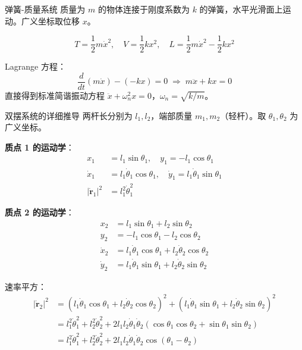 \begin{example}{弹簧-质量系统}
	质量为 $m$ 的物体连接于刚度系数为 $k$ 的弹簧，水平光滑面上运动。广义坐标取位移 $x$。
	
	\[
	T = \frac{1}{2} m \dot{x}^2, \quad V = \frac{1}{2} k x^2, \quad L = \frac{1}{2} m \dot{x}^2 - \frac{1}{2} k x^2
	\]
	
	Lagrange 方程：
	\[
	\frac{d}{dt} \left( m \dot{x} \right) - (-k x) = 0 \;\Longrightarrow\; m \ddot{x} + k x = 0
	\]
	直接得到标准简谐振动方程 $\ddot{x} + \omega_n^2 x = 0$，$\omega_n = \sqrt{k/m}$。
\end{example}

\begin{example}{双摆系统的详细推导}
	两杆长分别为 $l_1, l_2$，端部质量 $m_1, m_2$（轻杆）。取 $\theta_1, \theta_2$ 为广义坐标。
	
	\textbf{质点 1 的运动学}：
	\begin{align*}
		x_1 &= l_1 \sin\theta_1, \quad y_1 = -l_1 \cos\theta_1 \\
		\dot{x}_1 &= l_1 \dot{\theta}_1 \cos\theta_1, \quad \dot{y}_1 = l_1 \dot{\theta}_1 \sin\theta_1 \\
		|\dot{\mathbf{r}}_1|^2 &= l_1^2 \dot{\theta}_1^2
	\end{align*}
	
	\textbf{质点 2 的运动学}：
	\begin{align*}
		x_2 &= l_1 \sin\theta_1 + l_2 \sin\theta_2 \\
		y_2 &= -l_1 \cos\theta_1 - l_2 \cos\theta_2 \\[3pt]
		\dot{x}_2 &= l_1 \dot{\theta}_1 \cos\theta_1 + l_2 \dot{\theta}_2 \cos\theta_2 \\
		\dot{y}_2 &= l_1 \dot{\theta}_1 \sin\theta_1 + l_2 \dot{\theta}_2 \sin\theta_2
	\end{align*}
	
	速率平方：
	\[
	\begin{aligned}
	|\dot{\mathbf{r}}_2|^2 &= (l_1 \dot{\theta}_1 \cos\theta_1 + l_2 \dot{\theta}_2 \cos\theta_2)^2 + (l_1 \dot{\theta}_1 \sin\theta_1 + l_2 \dot{\theta}_2 \sin\theta_2)^2 \\
	&= l_1^2 \dot{\theta}_1^2 + l_2^2 \dot{\theta}_2^2 + 2 l_1 l_2 \dot{\theta}_1 \dot{\theta}_2 (\cos\theta_1 \cos\theta_2 + \sin\theta_1 \sin\theta_2) \\
	&= l_1^2 \dot{\theta}_1^2 + l_2^2 \dot{\theta}_2^2 + 2 l_1 l_2 \dot{\theta}_1 \dot{\theta}_2 \cos(\theta_1 - \theta_2)
	\end{aligned}
	\]
	

\end{example}
